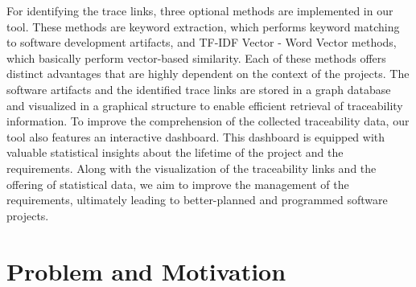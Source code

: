 \documentclass[conference]{IEEEtran}
\begin{document}
For identifying the trace links, three optional methods are implemented in our tool. These methods are keyword extraction, which performs keyword matching to software development artifacts, and TF-IDF Vector - Word Vector methods, which basically perform vector-based similarity. Each of these methods offers distinct advantages that are highly dependent on the context of the projects.
The software artifacts and the identified trace links are stored in a graph database and visualized in a graphical structure to enable efficient retrieval of traceability information. To improve the comprehension of the collected traceability data, our tool also features an interactive dashboard. This dashboard is equipped with valuable statistical insights about the lifetime of the project and the requirements. Along with the visualization of the traceability links and the offering of statistical data, we aim to improve the management of the requirements, ultimately leading to better-planned and programmed software projects.

\section{Problem and Motivation}
\label{section:problem}



\end{document}
